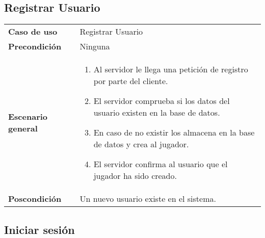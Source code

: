 

\subsection{Registrar Usuario}

{\footnotesize
\begin{tabularx}{0.95\textwidth}{p{}|X}

\textbf{Caso de uso} & Registrar Usuario \\

\textbf{Precondición} & Ninguna \\

\textbf{Escenario general} & \begin{enumerate}
\item Al servidor le llega una petición de registro por parte del cliente.
\item El servidor comprueba si los datos del usuario existen en la base de datos.
\item En caso de no existir los almacena en la base de datos y crea al jugador.
\item El servidor confirma al usuario que el jugador ha sido creado.
\end{enumerate} \\

\textbf{Poscondición} & Un nuevo usuario existe en el sistema.

\end{tabularx}
}

\subsection{Iniciar sesión}


